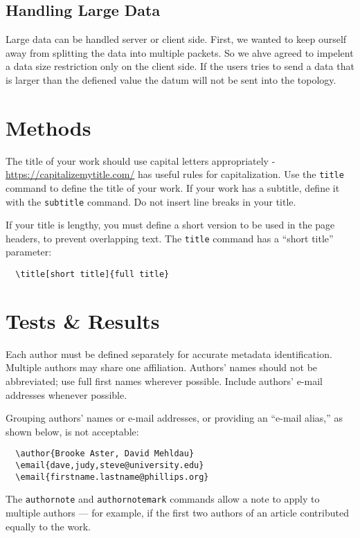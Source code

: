 \documentclass[sigconf,natbib=false]{acmart}
\begin{document}
\subsection{Handling Large Data}
Large data can be handled server or client side. First, we wanted to keep ourself away from splitting the data into multiple packets. So we ahve agreed to impelent a data size restriction only on the client side. If the users tries to send a data that is larger than the defiened value the datum will not be sent into the topology.

\section{Methods}

The title of your work should use capital letters appropriately -
\url{https://capitalizemytitle.com/} has useful rules for
capitalization. Use the {\verb|title|} command to define the title of
your work. If your work has a subtitle, define it with the
{\verb|subtitle|} command.  Do not insert line breaks in your title.

If your title is lengthy, you must define a short version to be used
in the page headers, to prevent overlapping text. The \verb|title|
command has a ``short title'' parameter:
\begin{verbatim}
  \title[short title]{full title}
\end{verbatim}

\section{Tests \& Results}

Each author must be defined separately for accurate metadata
identification. Multiple authors may share one affiliation. Authors'
names should not be abbreviated; use full first names wherever
possible. Include authors' e-mail addresses whenever possible.

Grouping authors' names or e-mail addresses, or providing an ``e-mail
alias,'' as shown below, is not acceptable:
\begin{verbatim}
  \author{Brooke Aster, David Mehldau}
  \email{dave,judy,steve@university.edu}
  \email{firstname.lastname@phillips.org}
\end{verbatim}

The \verb|authornote| and \verb|authornotemark| commands allow a note
to apply to multiple authors --- for example, if the first two authors
of an article contributed equally to the work.
\end{document}
